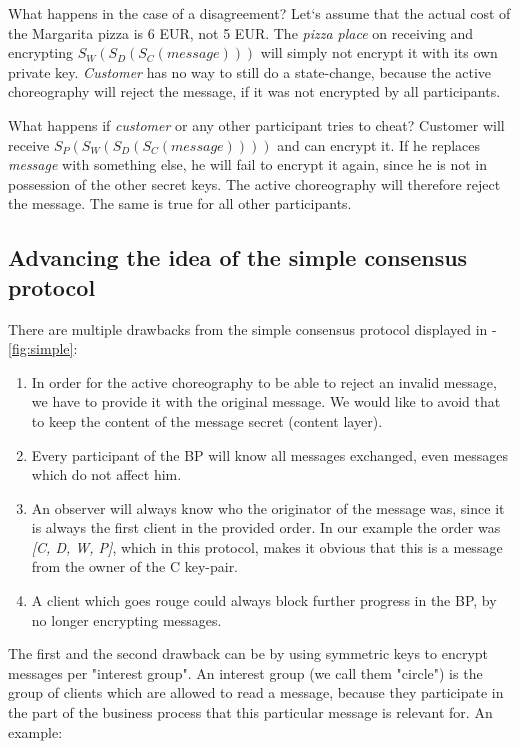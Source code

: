 \documentclass[runningheads]{llncs}
\begin{document}
What happens in the case of a disagreement? Let`s assume that the actual cost of the Margarita pizza is 6 EUR, not 5 EUR. The \textit{pizza place} on receiving and encrypting  $S_W(S_D(S_C(message)))$ will simply not encrypt it with its own private key. \textit{Customer} has no way to still do a state-change, because the active choreography will reject the message, if it was not encrypted by all participants. 

What happens if \textit{customer} or any other participant tries to cheat? Customer will receive $S_P(S_W(S_D(S_C(message))))$ and can encrypt it. If he replaces \textit{message} with something else, he will fail to encrypt it again, since he is not in possession of the other secret keys. The active choreography will therefore reject the message. The same is true for all other participants. 


\subsection{Advancing the idea of the simple consensus protocol}

There are multiple drawbacks from the simple consensus protocol displayed in -\ref{fig:simple}: 

\begin{enumerate}
    \item In order for the active choreography to be able to reject an invalid message, we have to provide it with the original message. We would like to avoid that to keep the content of the message secret (content layer).
    \item Every participant of the BP will know all messages exchanged, even messages which do not affect him. 
    \item An observer will always know who the originator of the message was, since it is always the first client in the provided order. In our example the order was \textit{[C, D, W, P]}, which in this protocol, makes it obvious that this is a message from the owner of the C key-pair.
    \item A client which goes rouge could always block further progress in the BP, by no longer encrypting messages.
\end{enumerate}

The first and the second drawback can be by using symmetric keys to encrypt messages per "interest group". An interest group (we call them "circle") is the group of clients which are allowed to read a message, because they participate in the part of the business process that this particular message is relevant for. An example: 
\end{document}
